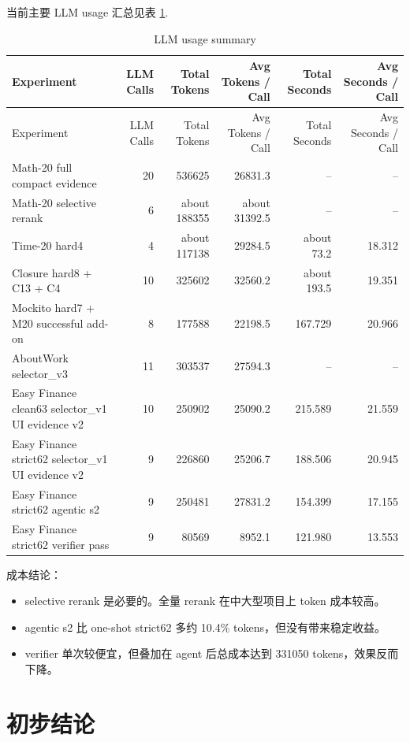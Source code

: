 \documentclass[12pt,a4paper]{ctexart}
\begin{document}
当前主要 LLM usage 汇总见表 \ref{tab:cost}.

\begin{landscape}
\begin{longtable}{@{}p{6.0cm}rrrrr@{}}
\caption{LLM usage summary}
\label{tab:cost}\\
\toprule
Experiment & LLM Calls & Total Tokens & Avg Tokens / Call & Total Seconds & Avg Seconds / Call \\
\midrule
\endfirsthead
\toprule
Experiment & LLM Calls & Total Tokens & Avg Tokens / Call & Total Seconds & Avg Seconds / Call \\
\midrule
\endhead
\bottomrule
\endfoot
Math-20 full compact evidence & 20 & 536625 & 26831.3 & -- & -- \\
Math-20 selective rerank & 6 & about 188355 & about 31392.5 & -- & -- \\
Time-20 hard4 & 4 & about 117138 & 29284.5 & about 73.2 & 18.312 \\
Closure hard8 + C13 + C4 & 10 & 325602 & 32560.2 & about 193.5 & 19.351 \\
Mockito hard7 + M20 successful add-on & 8 & 177588 & 22198.5 & 167.729 & 20.966 \\
AboutWork selector\_v3 & 11 & 303537 & 27594.3 & -- & -- \\
Easy Finance clean63 selector\_v1 UI evidence v2 & 10 & 250902 & 25090.2 & 215.589 & 21.559 \\
Easy Finance strict62 selector\_v1 UI evidence v2 & 9 & 226860 & 25206.7 & 188.506 & 20.945 \\
Easy Finance strict62 agentic s2 & 9 & 250481 & 27831.2 & 154.399 & 17.155 \\
Easy Finance strict62 verifier pass & 9 & 80569 & 8952.1 & 121.980 & 13.553 \\
\end{longtable}
\end{landscape}

成本结论：

\begin{itemize}
  \item selective rerank 是必要的。全量 rerank 在中大型项目上 token 成本较高。
  \item agentic s2 比 one-shot strict62 多约 10.4\% tokens，但没有带来稳定收益。
  \item verifier 单次较便宜，但叠加在 agent 后总成本达到 331050 tokens，效果反而下降。
\end{itemize}

\section{初步结论}
\end{document}

